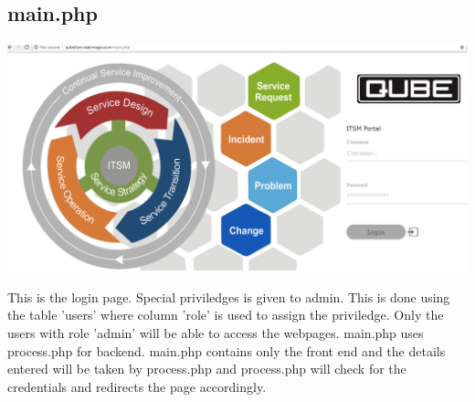 \documentclass{article}
\begin{document}
\subsection{main.php}
\begin{center}

    \includegraphics[width=7.0in]{main.png}
   
    \label{}

\end{center}
This is the login page. Special priviledges is given to admin. This is done using the table 'users' where column 'role' is used to assign the priviledge. Only the users with role 'admin' will be able to access the webpages. main.php uses process.php for backend. main.php contains only the front end and the details entered will be taken by process.php and process.php will check for the credentials and redirects the page accordingly. 
\end{document}
